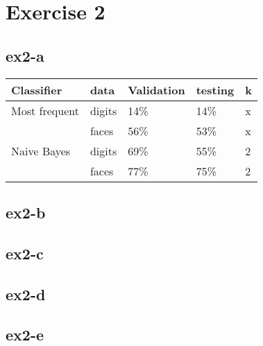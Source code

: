 \section{Exercise 2}
\subsection{ex2-a}
\begin{table}[]
\begin{tabular}{|l|l||l|l||l|}
\hline
Classifier    & data   & Validation & testing & k \\ \hline
Most frequent & digits & 14\%       & 14\%    & x \\ 
              & faces  & 56\%       & 53\%    & x \\ \hline
Naive Bayes   & digits & 69\%       & 55\%    & 2 \\ 
              & faces  & 77\%       & 75\%    & 2 \\ \hline

\end{tabular}
\end{table}

\subsection{ex2-b}

\subsection{ex2-c}

\subsection{ex2-d}

\subsection{ex2-e}